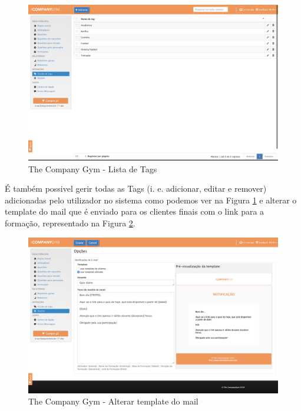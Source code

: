 \newpage


\begin{figure}[ht!]
	\begin{center}
		\includegraphics[width=1\textwidth]{img/tcg/tcg-tags.png}
		\caption{The Company Gym - Lista de Tags}
		\label{fig:tcg-tags}
	\end{center}
\end{figure}

É também possivel gerir todas as Tags (i. e. adicionar, editar e remover) adicionadas pelo utilizador no sistema como podemos ver na Figura \ref{fig:tcg-tags} e alterar o template do mail que é enviado para os clientes finais com o link para a formação, representado na Figura \ref{fig:tcg-mail}. 

\begin{figure}[ht!]
	\begin{center}
		\includegraphics[width=1\textwidth]{img/tcg/tcg-mail.png}
		\caption{The Company Gym - Alterar template do mail}
		\label{fig:tcg-mail}
	\end{center}
\end{figure}

